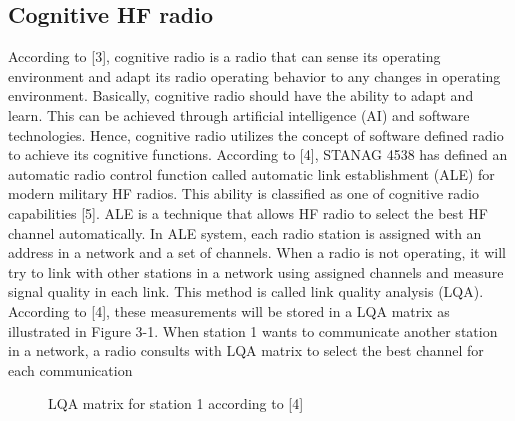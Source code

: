 \documentclass[conference]{IEEEtran}
\begin{document}
\subsection{Cognitive HF radio}
According to [3], cognitive radio is a radio that can sense its operating environment and adapt its radio operating behavior to any changes in operating environment. Basically, cognitive radio should have the ability to adapt and learn. This can be achieved through artificial intelligence (AI) and software technologies. Hence, cognitive radio utilizes the concept of software defined radio to achieve its cognitive functions. 
According to [4], STANAG 4538 has defined an automatic radio control function called automatic link establishment (ALE) for modern military HF radios. This ability is classified as one of cognitive radio capabilities [5]. ALE is a technique that allows HF radio to select the best HF channel automatically. In ALE system, each radio station is assigned with an address in a network and a set of channels. When a radio is not operating, it will try to link with other stations in a network using assigned channels and measure signal quality in each link. This method is called link quality analysis (LQA). According to [4], these measurements will be stored in a LQA matrix as illustrated in Figure 3-1. When station 1 wants to communicate another station in a network, a radio consults with LQA matrix to select the best channel for each communication

\begin{figure}[h!]
	\centering
	\caption{LQA matrix for station 1 according to [4]}
\end{figure}
\end{document}
